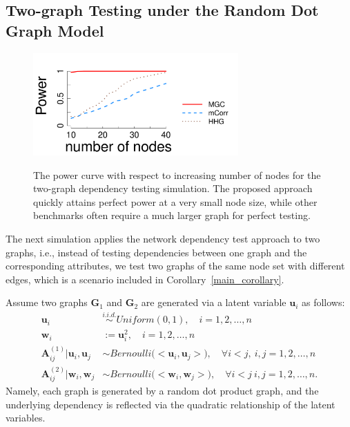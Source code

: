 \documentclass[12pt]{article}
\theoremstyle{definition}
\begin{document}
	\subsection{Two-graph Testing under the Random Dot Graph Model}
	\label{ssec:twographs}
	
	\begin{figure}[ht]
		\centering
		\includegraphics[width=0.7\textwidth]{../Figure/twoGraphs1.pdf}
		\label{fig:twographs1}
		\caption{The power curve with respect to increasing number of nodes for the two-graph dependency testing simulation. The proposed approach quickly attains perfect power at a very small node size, while other benchmarks often require a much larger graph for perfect testing.} 
		\label{fig:graphtest}
	\end{figure}
	
	The next simulation applies the network dependency test approach to two graphs, i.e., instead of testing dependencies between one graph and the corresponding attributes, we test two graphs of the same node set with different edges, which is a scenario included in Corollary~\ref{main_corollary}. 
	
	Assume two graphs $\mathbf{G}_{1}$ and $\mathbf{G}_{2}$ are generated via a latent variable $\mathbf{u}_{i}$ as follows:
	\begin{equation}
	\begin{split}
	\mathbf{u}_{i} & \overset{i.i.d.}{\sim} Uniform(0, 1), \quad i=1,2, \ldots, n\\
	\mathbf{w}_{i} & := \mathbf{u}^{2}_{i}, \quad i = 1,2, \ldots, n \\
	\mathbf{A}^{(1)}_{ij} \big| \mathbf{u}_{i}, \mathbf{u}_{j} & \sim Bernoulli \big( <\mathbf{u}_{i}, \mathbf{u}_{j}  > \big), \quad \forall i < j,~i,j=1,2, \ldots, n \\
	\mathbf{A}^{(2)}_{ij} \big| \mathbf{w}_{i}, \mathbf{w}_{j} & \sim Bernoulli \big( <\mathbf{w}_{i}, \mathbf{w}_{j}  > \big), \quad \forall i < j~i,j=1,2, \ldots, n.
	\end{split}
	\end{equation}
	Namely, each graph is generated by a random dot product graph, and the underlying dependency is reflected via the quadratic relationship of the latent variables. 
	
\end{document}
